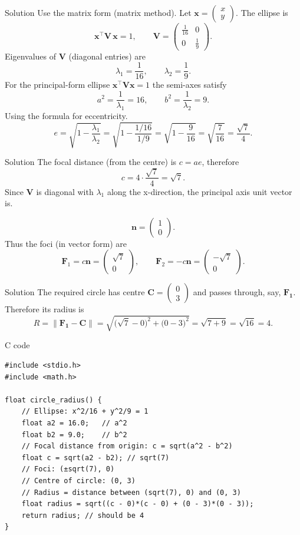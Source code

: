 \documentclass{beamer}
\newcommand{\myvec}[1]{\begin{pmatrix}#1\end{pmatrix}}
\renewcommand{\vec}[1]{\mathbf{#1}}
\begin{document}
\begin{frame}{Solution}
Use the matrix form (matrix method). Let $\vec{x}=\myvec{x\\[2pt]y}$. The ellipse is
\[
\vec{x}^\top \vec{V}\,\vec{x}=1,\qquad
\vec{V}=\myvec{\frac{1}{16} & 0\\[2pt]0 & \frac{1}{9}}.
\]
Eigenvalues of $\vec{V}$ (diagonal entries) are
\[
\lambda_1=\frac{1}{16},\qquad \lambda_2=\frac{1}{9}.
\]
For the principal-form ellipse $\vec{x}^\top\vec{V}\vec{x}=1$ the semi-axes satisfy
\[
a^2=\frac{1}{\lambda_1}=16,\qquad b^2=\frac{1}{\lambda_2}=9.
\]
Using the formula for eccentricity.
\[
e=\sqrt{1-\frac{\lambda_1}{\lambda_2}}
=\sqrt{1-\frac{1/16}{1/9}}
=\sqrt{1-\frac{9}{16}}
=\sqrt{\frac{7}{16}}
=\frac{\sqrt7}{4}.
\]
\end{frame}
\begin{frame}{Solution}
The focal distance (from the centre) is \(c = a e\), therefore
\[
c = 4\cdot\frac{\sqrt7}{4}=\sqrt7.
\]
Since \(\vec V\) is diagonal with \(\lambda_1\) along the x-direction, the principal axis unit vector is.

\[
\vec n=\myvec{1\\[2pt]0}.
\]
Thus the foci (in vector form) are
\[
\vec F_1 = c\vec n = \myvec{\sqrt7\\[2pt]0},\qquad
\vec F_2 = -c\vec n = \myvec{-\sqrt7\\[2pt]0}.
\]
\end{frame}
\begin{frame}{Solution}
The required circle has centre $\vec{C}=\myvec{0\\[2pt]3}$ and passes through, say, $\vec{F_1}$. Therefore its radius is
\[
R=\left\|{\vec{F_1}-\vec{C}}\right\|
=\sqrt{\bigl(\sqrt{7}-0\bigr)^2+\bigl(0-3\bigr)^2}
=\sqrt{7+9}
=\sqrt{16}
=\boxed{4}.
\]
\end{frame}
\begin{frame}[fragile]{C code}
\begin{lstlisting}
#include <stdio.h>
#include <math.h>

float circle_radius() {
    // Ellipse: x^2/16 + y^2/9 = 1
    float a2 = 16.0;   // a^2
    float b2 = 9.0;    // b^2
    // Focal distance from origin: c = sqrt(a^2 - b^2)
    float c = sqrt(a2 - b2); // sqrt(7)
    // Foci: (±sqrt(7), 0)
    // Centre of circle: (0, 3)
    // Radius = distance between (sqrt(7), 0) and (0, 3)
    float radius = sqrt((c - 0)*(c - 0) + (0 - 3)*(0 - 3));
    return radius; // should be 4
}

\end{lstlisting}
\end{frame}
\end{document}
